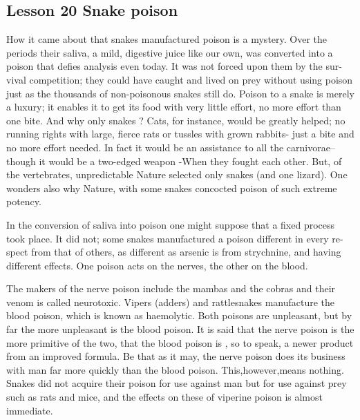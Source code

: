 \documentclass[kindlepaper]{BHCexam4kindle}
\begin{document}
\subsection{Lesson 20
Snake poison}
\par
How it came about that snakes manufactured poison is a mystery. Over the
periods their saliva, a mild, digestive juice like our own, was converted into a
poison that defies analysis even today. It was not forced upon them by the sur-
vival competition; they could have caught and lived on prey without using
poison just as the thousands of non-poisonous snakes still do. Poison to a snake
is merely a luxury; it enables it to get its food with very little effort, no more
effort than one bite. And why only snakes ? Cats, for instance, would be greatly
helped; no running rights with large, fierce rats or tussles with grown rabbits-
just a bite and no more effort needed. In fact it would be an assistance to all the
carnivorae--though it would be a two-edged weapon -When they fought each
other. But, of the vertebrates, unpredictable Nature selected only snakes (and
one lizard). One wonders also why Nature, with some snakes concocted poison
of such extreme potency.
\par
In the conversion of saliva into poison one might suppose that a fixed process
took place. It did not; some snakes manufactured a poison different in every re-
spect from that of others, as different as arsenic is from strychnine, and having
different effects. One poison acts on the nerves, the other on the blood.
\par
The makers of the nerve poison include the mambas and the cobras and their
venom is called neurotoxic. Vipers (adders) and rattlesnakes manufacture the
blood poison, which is known as haemolytic. Both poisons are unpleasant, but
by far the more unpleasant is the blood poison. It is said that the nerve poison
is the more primitive of the two, that the blood poison is , so to speak, a newer
product from an improved formula. Be that as it may, the nerve poison does its
business with man far more quickly than the blood poison. This,however,means
nothing. Snakes did not acquire their poison for use against man but for use
against prey such as rats and mice, and the effects on these of viperine poison is
almost immediate.
\clearpage
\end{document}
